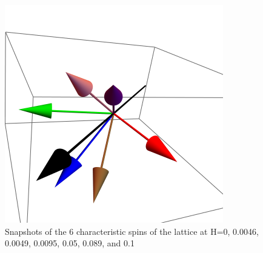 \documentclass{article}
\begin{document}
\begin{figure}[ht]
\includegraphics[scale=0.28]{HVariedData/Pictures/110Inc51S.png}
\caption{Snapshots of the 6 characteristic spins of the lattice at H=0, 0.0046, 0.0049, 0.0095, 0.05, 0.089, and 0.1}
\end{figure}
\clearpage
\end{document}
